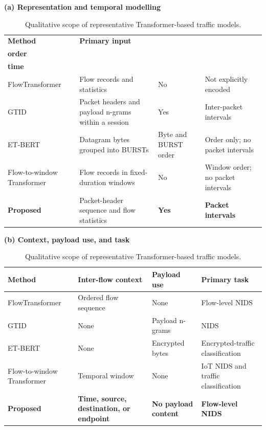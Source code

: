 \documentclass[11pt,fleqn]{report}
\begin{document}
\begin{table}[H]
\centering
\caption{Qualitative scope of representative Transformer-based traffic models.}
\label{tab:rw_model_comparison}
\small
\setlength{\tabcolsep}{5pt}
\renewcommand{\arraystretch}{1.20}

\textbf{(a) Representation and temporal modelling}\par\smallskip
\begin{tabularx}{\textwidth}{@{}
    >{\raggedright\arraybackslash}p{2.80cm}
    >{\raggedright\arraybackslash}X
    >{\centering\arraybackslash}p{2.10cm}
    >{\centering\arraybackslash}p{3.20cm}@{}}
\toprule
\textbf{Method} & \textbf{Primary input} &
\shortstack{\textbf{Packet}\\\textbf{order}} &
\shortstack{\textbf{Elapsed}\\\textbf{time}} \\
\midrule
FlowTransformer \cite{Manocchio2024FlowTransformer} &
Flow records and statistics & No & Not explicitly encoded \\
GTID \cite{Han2023GTID} &
Packet headers and payload n-grams within a session & Yes & Inter-packet intervals \\
ET-BERT \cite{Lin2022ETBERT} &
Datagram bytes grouped into BURSTs & Byte and BURST order & Order only; no packet intervals \\
Flow-to-window Transformer \cite{MartinReizabal2026FlowWindow} &
Flow records in fixed-duration windows & No & Window order; no packet intervals \\
\textbf{Proposed} &
Packet-header sequence and flow statistics & \textbf{Yes} & \textbf{Packet intervals} \\
\bottomrule
\end{tabularx}

\vspace{0.8em}
\textbf{(b) Context, payload use, and task}\par\smallskip
\begin{tabularx}{\textwidth}{@{}
    >{\raggedright\arraybackslash}p{2.80cm}
    >{\raggedright\arraybackslash}X
    >{\centering\arraybackslash}p{2.80cm}
    >{\raggedright\arraybackslash}p{4.10cm}@{}}
\toprule
\textbf{Method} & \textbf{Inter-flow context} &
\textbf{Payload use} & \textbf{Primary task} \\
\midrule
FlowTransformer \cite{Manocchio2024FlowTransformer} &
Ordered flow sequence & None & Flow-level NIDS \\
GTID \cite{Han2023GTID} &
None & Payload n-grams & NIDS \\
ET-BERT \cite{Lin2022ETBERT} &
None & Encrypted bytes & Encrypted-traffic classification \\
Flow-to-window Transformer \cite{MartinReizabal2026FlowWindow} &
Temporal window & None & IoT NIDS and traffic classification \\
\textbf{Proposed} &
\textbf{Time, source, destination, or endpoint} &
\textbf{No payload content} & \textbf{Flow-level NIDS} \\
\bottomrule
\end{tabularx}


\end{table}
\end{document}
